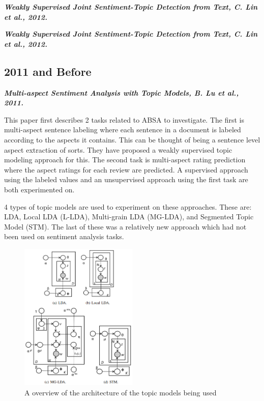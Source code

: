 \documentclass[conference]{IEEEtran}
\begin{document}
\textit{\textbf{Weakly Supervised Joint Sentiment-Topic Detection from Text, C. Lin et al., 2012.}}

\textit{\textbf{Weakly Supervised Joint Sentiment-Topic Detection from Text, C. Lin et al., 2012.}}

\subsection{2011 and Before}

\textit{\textbf{Multi-aspect Sentiment Analysis with Topic Models, B. Lu et al., 2011.}}

This paper first describes 2 tasks related to ABSA to investigate. The first is multi-aspect sentence labeling where each sentence in a document is labeled according to the aspects it contains. This can be thought of being a sentence level aspect extraction of sorts. They have proposed a weakly supervised topic modeling approach for this. The second task is multi-aspect rating prediction where the aspect ratings for each review are predicted. A supervised approach using the labeled values and an unsupervised approach using the first task are both experimented on.

4 types of topic models are used to experiment on these approaches. These are: LDA, Local LDA (L-LDA), Multi-grain LDA (MG-LDA), and Segmented Topic Model (STM). The last of these was a relatively new approach which had not been used on sentiment analysis tasks.

\begin{figure}[htbp]
\centerline{\includegraphics[keepaspectratio, width=0.5\textwidth]{pics/12.png}}
\caption{A overview of the architecture of the topic models being used}
\label{fig}
\end{figure}
\end{document}
